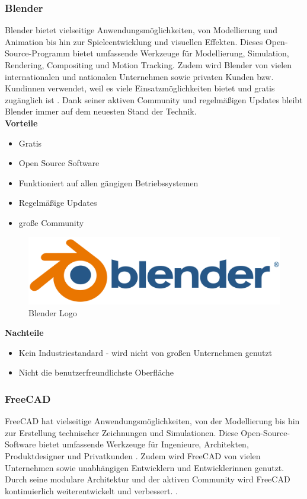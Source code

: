 \subsubsection{Blender} 
Blender bietet vielseitige Anwendungsmöglichkeiten, von Modellierung und Animation bis hin zur Spieleentwicklung und visuellen Effekten. Dieses Open-Source-Programm bietet umfassende Werkzeuge für Modellierung, Simulation, Rendering, Compositing und Motion Tracking. Zudem wird Blender von vielen internationalen und nationalen Unternehmen sowie privaten Kunden bzw. Kundinnen verwendet, weil es viele Einsatzmöglichkeiten bietet und gratis zugänglich ist \parencite{Blender}. Dank seiner aktiven Community und regelmäßigen Updates bleibt Blender immer auf dem neuesten Stand der Technik. \\


\textbf{Vorteile}
\begin{itemize}
	\item Gratis 
	\item Open Source Software
	\item Funktioniert auf allen gängigen Betriebssystemen
	\item Regelmäßige Updates
	\item große Community \parencite{BlenderProsUndCons}
\end{itemize}

\begin{figure}[H]
	\centering
	\includegraphics[width=0.3\linewidth]{images/Logo_Blender.png}
	\caption[Blender Logo]{Blender Logo}
	\label{fig:Blender}
\end{figure}


\textbf{Nachteile}
\begin{itemize}
	\item Kein Industriestandard - wird nicht von großen Unternehmen genutzt
	\item Nicht die benutzerfreundlichste Oberfläche \parencite{BlenderProsUndCons}
\end{itemize}



\subsubsection{FreeCAD}
FreeCAD hat vielseitige Anwendungsmöglichkeiten, von der Modellierung bis hin zur Erstellung technischer Zeichnungen und Simulationen. Diese Open-Source-Software bietet umfassende Werkzeuge für Ingenieure, Architekten, Produktdesigner und Privatkunden \parencite{FreeCAD}. Zudem wird FreeCAD von vielen Unternehmen sowie unabhängigen Entwicklern und Entwicklerinnen genutzt. Durch seine modulare Architektur und der aktiven Community wird FreeCAD kontinuierlich weiterentwickelt und verbessert.   \parencite{FreeCAD2}. \\


